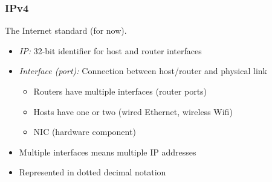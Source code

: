 \documentclass{article}
\begin{document}
\subsubsection{IPv4}
The Internet standard (for now).
\begin{itemize}
    \item \textit{IP:} 32-bit identifier for host and router interfaces
    \item \textit{Interface (port):} Connection between host/router and physical link
    \begin{itemize}
        \item Routers have multiple interfaces (router ports)
        \item Hosts have one or two (wired Ethernet, wireless Wifi)
        \item NIC (hardware component)
    \end{itemize}
    \item Multiple interfaces means multiple IP addresses
    \item Represented in dotted decimal notation
\end{itemize}

\end{document}
